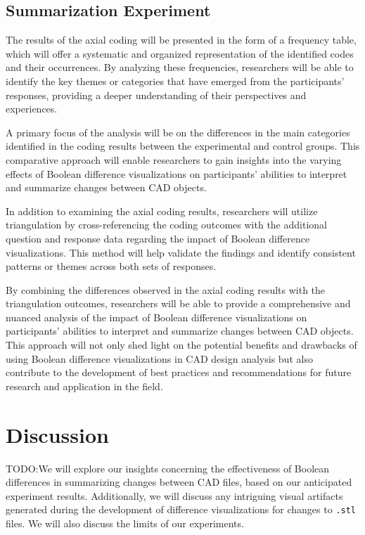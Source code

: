 \documentclass[sigconf,authorversion,nonacm]{acmart}
\begin{document}
\subsection{Summarization Experiment}

The results of the axial coding will be presented in the form of a frequency table, which will offer a systematic and organized representation of the identified codes and their occurrences.
By analyzing these frequencies, researchers will be able to identify the key themes or categories that have emerged from the participants' responses, providing a deeper understanding of their perspectives and experiences.

A primary focus of the analysis will be on the differences in the main categories identified in the coding results between the experimental and control groups.
This comparative approach will enable researchers to gain insights into the varying effects of Boolean difference visualizations on participants' abilities to interpret and summarize changes between CAD objects.

In addition to examining the axial coding results, researchers will utilize triangulation by cross-referencing the coding outcomes with the additional question and response data regarding the impact of Boolean difference visualizations.
This method will help validate the findings and identify consistent patterns or themes across both sets of responses.

By combining the differences observed in the axial coding results with the triangulation outcomes, researchers will be able to provide a comprehensive and nuanced analysis of the impact of Boolean difference visualizations on participants' abilities to interpret and summarize changes between CAD objects.
This approach will not only shed light on the potential benefits and drawbacks of using Boolean difference visualizations in CAD design analysis but also contribute to the development of best practices and recommendations for future research and application in the field.


\section{Discussion}

TODO:We will explore our insights concerning the effectiveness of Boolean differences in summarizing changes between CAD files, based on our anticipated experiment results. Additionally, we will discuss any intriguing visual artifacts generated during the development of difference visualizations for changes to \texttt{.stl} files. We will also discuss the limits of our experiments.
\end{document}
